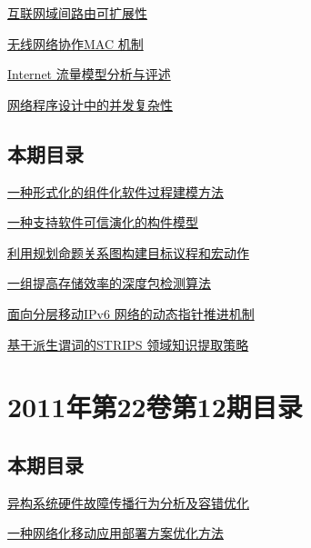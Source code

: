 \documentclass[a4paper]{article}
\begin{document}
\href{http://www.jos.org.cn/ch/reader/download_pdf.aspx?file_no=3935&year_id=2011&quarter_id=1&falg=1}{互联网域间路由可扩展性}

\href{http://www.jos.org.cn/ch/reader/download_pdf.aspx?file_no=3936&year_id=2011&quarter_id=1&falg=1}{无线网络协作MAC 机制}

\href{http://www.jos.org.cn/ch/reader/download_pdf.aspx?file_no=3950&year_id=2011&quarter_id=1&falg=1}{Internet 流量模型分析与评述}

\href{http://www.jos.org.cn/ch/reader/download_pdf.aspx?file_no=3899&year_id=2011&quarter_id=1&falg=1}{网络程序设计中的并发复杂性}

\subsection{本期目录}
\href{http://www.jos.org.cn/ch/reader/download_pdf.aspx?file_no=3769&year_id=2011&quarter_id=1&falg=1}{一种形式化的组件化软件过程建模方法}

\href{http://www.jos.org.cn/ch/reader/download_pdf.aspx?file_no=3813&year_id=2011&quarter_id=1&falg=1}{一种支持软件可信演化的构件模型}

\href{http://www.jos.org.cn/ch/reader/download_pdf.aspx?file_no=3861&year_id=2011&quarter_id=1&falg=1}{利用规划命题关系图构建目标议程和宏动作}

\href{http://www.jos.org.cn/ch/reader/download_pdf.aspx?file_no=3724&year_id=2011&quarter_id=1&falg=1}{一组提高存储效率的深度包检测算法}

\href{http://www.jos.org.cn/ch/reader/download_pdf.aspx?file_no=3743&year_id=2011&quarter_id=1&falg=1}{面向分层移动IPv6 网络的动态指针推进机制}

\href{http://www.jos.org.cn/ch/reader/download_pdf.aspx?file_no=3726&year_id=2011&quarter_id=1&falg=1}{基于派生谓词的STRIPS 领域知识提取策略}


\section{\textbf{2011年第22卷第12期目录}}
\subsection{本期目录}
\href{http://www.jos.org.cn/ch/reader/download_pdf.aspx?file_no=4057&year_id=2011&quarter_id=12&falg=1}{异构系统硬件故障传播行为分析及容错优化}

\href{http://www.jos.org.cn/ch/reader/download_pdf.aspx?file_no=3992&year_id=2011&quarter_id=12&falg=1}{一种网络化移动应用部署方案优化方法}
\end{document}
